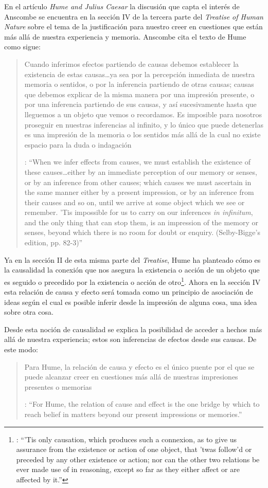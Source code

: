 En el artículo \emph{Hume and Julius Caesar} la discusión que capta el interés de Anscombe se encuentra en la sección IV de la tercera parte del \emph{Treatise of Human Nature} sobre el tema de la justificación para nuestro creer en cuestiones que están más allá de nuestra experiencia y memoria. Anscombe cita el texto de Hume como sigue: \blockquote[{\cite[86]{anscombe1981parmenides:humeandjulius}}: \enquote{When we infer effects from causes, we must establish the existence of these causes\ldots either by an immediate perception of our memory or senses, or by an inference from other causes; which causes we must ascertain in the same manner either by a present impression, or by an inference from their causes and so on, until we arrive at some object which we see or remember. 'Tis impossible for us to carry on our inferences \emph{in infinitum}, and the only thing that can stop them, is an impression of the memory or senses, beyond which there is no room for doubt or enquiry. (Selby-Bigge's edition, pp. 82-3)}]{Cuando inferimos efectos partiendo de causas debemos establecer la existencia de estas causas\ldots ya sea por la percepción inmediata de nuestra memoria o sentidos, o por la inferencia partiendo de otras causas; causas que debemos explicar de la misma manera por una impresión presente, o por una inferencia partiendo de sus causas, y así sucesivamente hasta que lleguemos a un objeto que vemos o recordamos. Es imposible para nosotros proseguir en nuestras inferencias al infinito, y lo único que puede detenerlas es una impresión de la memoria o los sentidos más allá de la cual no existe espacio para la duda o indagación}.

Ya en la sección II de esta misma parte del \emph{Treatise}, Hume ha planteado cómo es la causalidad la conexión que nos asegura la existencia o acción de un objeto que es seguido o precedido por la existencia o acción de otro\footnote{\cite[Cf.~][53]{hume1740treatise}: \enquote{’Tis only causation, which produces such a connexion, as to give us assurance from the existence or action of one object, that ’twas follow’d or preceded by any other existence or action; nor can the other two relations be ever made use of in reasoning, except so far as they either affect or are affected by it.}}. Ahora en la sección IV esta relación de causa y efecto será tomada como un principio de asociación de ideas según el cual es posible inferir desde la impresión de alguna cosa, una idea sobre otra cosa.

Desde esta noción de causalidad se explica la posibilidad de acceder a hechos más allá de nuestra experiencia; estos son inferencias de efectos desde sus causas. De este modo: \blockquote[{\cite[87]{anscombe1981parmenides:humeandjulius}}: \enquote{For Hume, the relation of cause and effect is the one bridge by which to reach belief in matters beyond our present impressions or memories.}]{Para Hume, la relación de causa y efecto es el único puente por el que se puede alcanzar creer en cuestiones más allá de nuestras impresiones presentes o memorias}.


